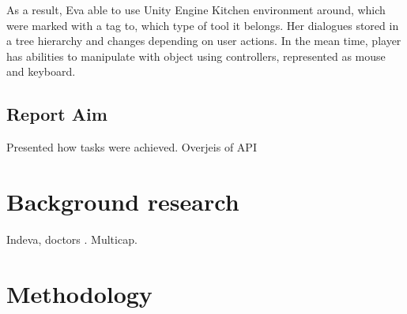 \documentclass[18pt]{article}
\numberwithin{equation}{section} %
\numberwithin{figure}{section} %
\numberwithin{table}{section} %
\begin{document}
	As a result, Eva able to use Unity Engine Kitchen environment around, which were marked with a tag to, which type of tool it belongs. Her dialogues stored in a tree hierarchy and changes depending on user actions. In the mean time, player has abilities to manipulate with object using controllers, represented as mouse and keyboard.
\subsection{Report Aim}
	Presented how tasks were achieved. Overjeis of API
\section{Background research}
	Indeva, doctors . Multicap.
\section{Methodology}	
\end{document}
